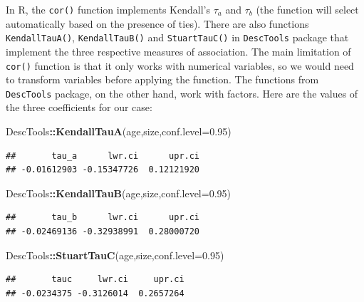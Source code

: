 \documentclass[
]{book}
\newenvironment{Shaded}{\begin{snugshade}}{\end{snugshade}}
\newcommand{\DataTypeTok}[1]{\textcolor[rgb]{0.13,0.29,0.53}{#1}}
\newcommand{\FloatTok}[1]{\textcolor[rgb]{0.00,0.00,0.81}{#1}}
\newcommand{\KeywordTok}[1]{\textcolor[rgb]{0.13,0.29,0.53}{\textbf{#1}}}
\newcommand{\NormalTok}[1]{#1}
\newcommand{\OperatorTok}[1]{\textcolor[rgb]{0.81,0.36,0.00}{\textbf{#1}}}
\theoremstyle{definition}
\theoremstyle{definition}
\theoremstyle{definition}
\theoremstyle{definition}
\theoremstyle{remark}
\begin{document}
In R, the \texttt{cor()} function implements Kendall's \(\tau_a\) and \(\tau_b\) (the function will select automatically based on the presence of ties). There are also functions \texttt{KendallTauA()}, \texttt{KendallTauB()} and \texttt{StuartTauC()} in \texttt{DescTools} package that implement the three respective measures of association. The main limitation of \texttt{cor()} function is that it only works with numerical variables, so we would need to transform variables before applying the function. The functions from \texttt{DescTools} package, on the other hand, work with factors. Here are the values of the three coefficients for our case:

\begin{Shaded}
\begin{Highlighting}[]
\NormalTok{DescTools}\OperatorTok{::}\KeywordTok{KendallTauA}\NormalTok{(age,size,}\DataTypeTok{conf.level=}\FloatTok{0.95}\NormalTok{)}
\end{Highlighting}
\end{Shaded}

\begin{verbatim}
##       tau_a      lwr.ci      upr.ci 
## -0.01612903 -0.15347726  0.12121920
\end{verbatim}

\begin{Shaded}
\begin{Highlighting}[]
\NormalTok{DescTools}\OperatorTok{::}\KeywordTok{KendallTauB}\NormalTok{(age,size,}\DataTypeTok{conf.level=}\FloatTok{0.95}\NormalTok{)}
\end{Highlighting}
\end{Shaded}

\begin{verbatim}
##       tau_b      lwr.ci      upr.ci 
## -0.02469136 -0.32938991  0.28000720
\end{verbatim}

\begin{Shaded}
\begin{Highlighting}[]
\NormalTok{DescTools}\OperatorTok{::}\KeywordTok{StuartTauC}\NormalTok{(age,size,}\DataTypeTok{conf.level=}\FloatTok{0.95}\NormalTok{)}
\end{Highlighting}
\end{Shaded}

\begin{verbatim}
##       tauc     lwr.ci     upr.ci 
## -0.0234375 -0.3126014  0.2657264
\end{verbatim}
\end{document}
